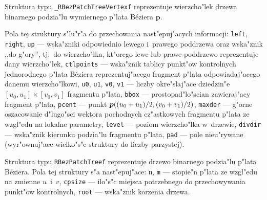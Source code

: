 \vspace{\bigskipamount}
\indent Struktura typu \texttt{\_RBezPatchTreeVertexf} reprezentuje wierzcho"lek
drzewa binarnego podzia"lu wymiernego p"lata B\'{e}ziera $\bm{p}$.

\begin{sloppypar}
Pola tej struktury s"lu"r"a do przechowania nast"epuj"acych informacji:
\texttt{left}, \texttt{right}, \texttt{up} --- wska"zniki odpowiednio lewego
i~prawego poddrzewa oraz wska"znik ,,do g"ory'', tj.\ do wierzcho"lka,
kt"orego lewe lub prawe poddrzewo reprezentuje dany wierzcho"lek,
\texttt{ctlpoints} --- wska"znik tablicy punkt"ow kontrolnych jednorodnego
p"lata B\'{e}ziera reprezentuj"acego fragment p"lata odpowiadaj"acego
danemu wierzcho"lkowi, \texttt{u0}, \texttt{u1}, \texttt{v0}, \texttt{v1}
--- liczby okre"slaj"ace dziedzin"e $[u_0,u_1]\times[v_0,v_1]$ fragmentu
p"lata, \texttt{bbox} --- prostopad"lo"scian zawieraj"acy fragment p"lata,
\texttt{pcent} --- punkt
$\bm{p}((u_0\nolinebreak +\nolinebreak u_1)/2,
(v_0\nolinebreak +\nolinebreak v_1)/2)$, \texttt{maxder}
--- g"orne oszacowanie d"lugo"sci wektora pochodnych cz"astkowych
fragmentu p"lata ze wzgl"edu na lokalne parametry, \texttt{level} --- poziom
wierzcho"lka w~drzewie, \texttt{divdir} --- wska"znik kierunku podzia"lu
fragmentu p"lata, \texttt{pad} --- pole nieu"rywane (wyr"ownuj"ace
wielko"s"c struktury do liczby pa\-rzystej).
\end{sloppypar}

\vspace{\bigskipamount}
Struktura typu \texttt{RBezPatchTreef} reprezentuje drzewo binarnego
podzia"lu p"lata B\'{e}ziera. Pola tej struktury s"a nast"epuj"ace:
\texttt{n}, \texttt{m} --- stopie"n p"lata ze wzgl"edu na zmienne $u$~i~$v$,
\texttt{cpsize} --- ilo"s"c miejsca potrzebnego do przechowywania punkt"ow
kontrolnych, \texttt{root} --- wska"znik korzenia drzewa.

